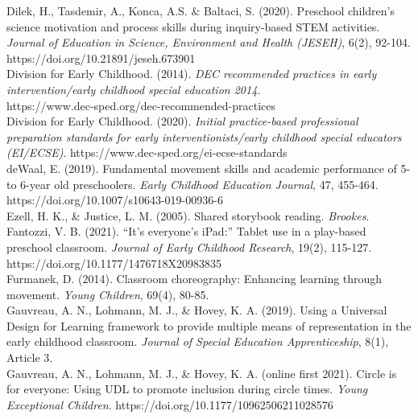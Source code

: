 \documentclass[11.5pt]{sig-alternate}
\begin{document}
Dilek, H., Tasdemir, A., Konca, A.S. \& Baltaci, S. (2020). Preschool children’s science 
motivation and process skills during inquiry-based STEM activities. \textit{Journal of Education in Science, Environment and Health (JESEH)}, 6(2), 92-104. https://doi.org/10.21891/jeseh.673901 
\\

Division for Early Childhood. (2014). \textit{DEC recommended practices in early intervention/early 
childhood special education 2014.} \\https://www.dec-sped.org/dec-recommended-practices 
\\

Division for Early Childhood. (2020). \textit{Initial practice-based professional preparation standards 
for early interventionists/early childhood special educators (EI/ECSE)}. https://www.dec-sped.org/ei-ecse-standards 
\\

deWaal, E. (2019). Fundamental movement skills and academic performance of 5-to 6-year old 
preschoolers. \textit{Early Childhood Education Journal}, 47, 455-464. \\https://doi.org/10.1007/s10643-019-00936-6 
\\

Ezell, H. K., \& Justice, L. M. (2005). Shared storybook reading. \textit{Brookes}.
\\

Fantozzi, V. B. (2021). “It’s everyone’s iPad:” Tablet use in a play-based preschool classroom. 
\textit{Journal of Early Childhood Research}, 19(2), 115-127. \\https://doi.org/10.1177/1476718X20983835 
\\

Furmanek, D. (2014). Classroom choreography: Enhancing learning through movement. \textit{Young Children}, 69(4), 80-85. 
\\
\newpage
Gauvreau, A. N., Lohmann, M. J., \& Hovey, K. A. (2019). Using a Universal Design for 
Learning framework to provide multiple means of representation in the early childhood classroom. \textit{Journal of Special Education Apprenticeship}, 8(1), Article 3.
\\

Gauvreau, A. N., Lohmann, M. J., \& Hovey, K. A. (online first 2021). Circle is for everyone: 
Using UDL to promote inclusion during circle times. \textit{Young Exceptional Children}. https://doi.org/10.1177/10962506211028576 
\\
\end{document}
